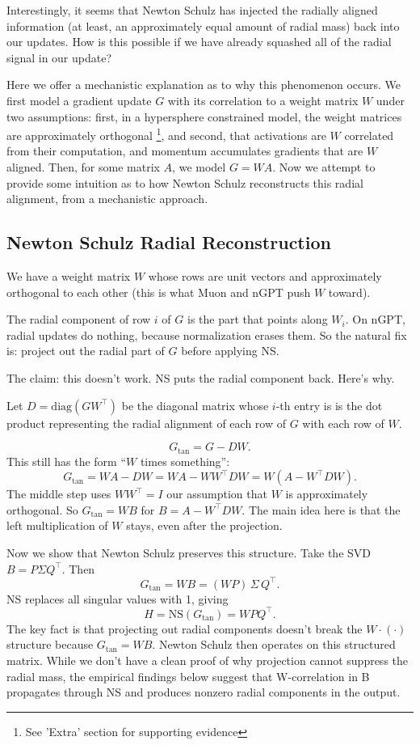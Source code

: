 \documentclass{article}
\begin{document}
Interestingly, it seems that Newton Schulz has injected the radially aligned information (at least, an approximately equal amount of radial mass) back into our updates. How is this possible if we have already squashed all of the radial signal in our update? 

Here we offer a mechanistic explanation as to why this phenomenon occurs. We first model a gradient update $G$ with its correlation to a weight matrix $W$ under two assumptions: first, in a hypersphere constrained model, the weight matrices are approximately orthogonal \footnote{See 'Extra' section for supporting evidence}, and second, that activations are $W$ correlated from their computation, and momentum accumulates gradients that are $W$ aligned. Then, for some matrix $A$, we model $G=WA$. Now we attempt to provide some intuition as to how Newton Schulz reconstructs this radial alignment, from a mechanistic approach.

\subsection{Newton Schulz Radial Reconstruction}

We have a weight matrix $W$ whose rows are unit vectors and approximately orthogonal to each other (this is what Muon and nGPT push $W$ toward). 

The radial component of row $i$ of $G$ is the part that points along $W_i$. On nGPT, radial updates do nothing, because normalization erases them. So the natural fix is: project out the radial part of $G$ before applying NS.

The claim: this doesn't work. NS puts the radial component back. Here's why.

Let $D=\mathrm{diag}(GW^\top)$ be the diagonal matrix whose $i$-th entry is is the dot product representing the radial alignment of each row of $G$ with each row of $W$.

\[
G_\text{tan} = G - DW.
\]
This still has the form ``$W$ times something'':
\[
G_\text{tan} = WA - DW = WA - WW^\top D W = W(A - W^\top D W).
\]
The middle step uses $WW^\top = I$ our assumption that $W$ is approximately orthogonal. So $G_\text{tan} = WB$ for $B = A - W^\top D W$. The main idea here is that the left multiplication of $W$ stays, even after the projection.

Now we show that Newton Schulz preserves this structure. Take the SVD $B = P\Sigma Q^\top$. Then
\[
G_\text{tan} = WB = (WP)\,\Sigma\, Q^\top.
\]
NS replaces all singular values with 1, giving
\[
H = \mathrm{NS}(G_\text{tan}) = WPQ^\top.
\]
The key fact is that projecting out radial components doesn't break the $W\cdot(\cdot)$ structure because $G_{\text{tan}}=WB$. Newton Schulz then operates on this structured matrix. While we don't have a clean proof of why projection cannot suppress the radial mass, the empirical findings below suggest that
W-correlation in B propagates through NS and produces nonzero radial components in the output.
\end{document}

